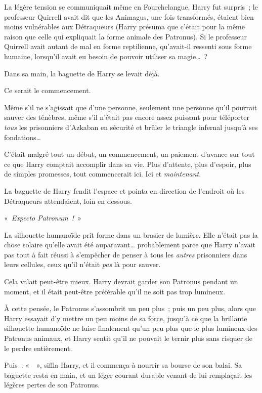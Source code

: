 La légère tension se communiquait même en Fourchelangue. Harry fut surpris~; le professeur Quirrell avait dit que les Animagus, une fois transformés, étaient bien moins vulnérables aux Détraqueurs (Harry présuma que c'était pour la même raison que celle qui expliquait la forme animale des Patronus). Si le professeur Quirrell avait autant de mal en forme reptilienne, qu'avait-il ressenti sous forme humaine, lorsqu'il avait eu besoin de pouvoir utiliser sa magie…~?

Dans sa main, la baguette de Harry se levait déjà.

Ce serait le commencement.

Même s'il ne s'agissait que d'une personne, seulement une personne qu'il pourrait sauver des ténèbres, même s'il n'était pas encore assez puissant pour téléporter \emph{tous} les prisonniers d'Azkaban en sécurité et brûler le triangle infernal jusqu'à ses fondations…

C'était malgré tout un début, un commencement, un paiement d'avance sur tout ce que Harry comptait accomplir dans sa vie. Plus d'attente, plus d'espoir, plus de simples promesses, tout commencerait ici. Ici et \emph{maintenant}.

La baguette de Harry fendit l'espace et pointa en direction de l'endroit où les Détraqueurs attendaient, loin en dessous.

«~\emph{Expecto Patronum~!}~»

La silhouette humanoïde prit forme dans un brasier de lumière. Elle n'était pas la chose solaire qu'elle avait été auparavant… probablement parce que Harry n'avait pas tout à fait réussi à s'empêcher de penser à tous les \emph{autres} prisonniers dans leurs cellules, ceux qu'il n'était \emph{pas} là pour sauver.

Cela valait peut-être mieux. Harry devrait garder son Patronus pendant un moment, et il était peut-être préférable qu'il ne soit pas trop lumineux.

À cette pensée, le Patronus s'assombrit un peu plus~; puis un peu plus, alors que Harry essayait d'y mettre un peu moins de sa force, jusqu'à ce que la brillante silhouette humanoïde ne luise finalement qu'un peu plus que le plus lumineux des Patronus animaux, et Harry sentit qu'il ne pouvait le ternir plus sans risquer de le perdre entièrement.

Puis~: «~~», siffla Harry, et il commença à nourrir sa bourse de son balai. Sa baguette resta en main, et un léger courant durable venant de lui remplaçait les légères pertes de son Patronus.

